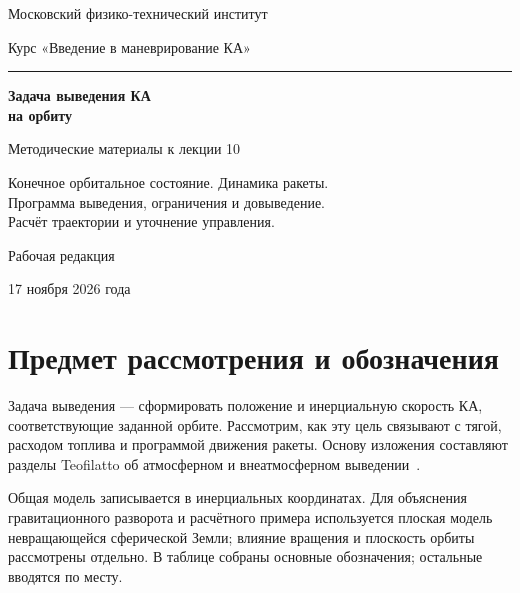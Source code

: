 \documentclass[a4paper,11pt]{article}
\numberwithin{equation}{section}
\begin{document}
\begin{titlepage}
\centering
{\large Московский физико-технический институт\par}
\vspace{8mm}
{\large Курс «Введение в маневрирование КА»\par}
\vspace{30mm}
{\color{accent}\rule{28mm}{.8pt}\par}
\vspace{9mm}
{\LARGE\bfseries Задача выведения КА\\[3mm]на орбиту\par}
\vspace{11mm}
{\large Методические материалы к лекции 10\par}
\vspace{8mm}
{Конечное орбитальное состояние. Динамика ракеты.\\
Программа выведения, ограничения и довыведение.\\
Расчёт траектории и уточнение управления.\par}
\vfill
{Рабочая редакция\par}
\vspace{3mm}
{17 ноября 2026 года\par}
\end{titlepage}
\setcounter{page}{2}
\begingroup\small
\setlength{\parskip}{0pt}
\tableofcontents
\endgroup
\clearpage

\section*{Предмет рассмотрения и обозначения}

Задача выведения --- сформировать положение и инерциальную скорость
КА, соответствующие заданной орбите. Рассмотрим, как эту цель
связывают с тягой, расходом топлива и программой движения ракеты.
Основу изложения составляют разделы Teofilatto об атмосферном
и внеатмосферном выведении~\cite{teofilatto}.

Общая модель записывается в инерциальных координатах.
Для объяснения гравитационного разворота и расчётного примера
используется плоская модель невращающейся сферической Земли;
влияние вращения и плоскость орбиты рассмотрены отдельно.
В таблице собраны основные обозначения; остальные вводятся по месту.
\end{document}

